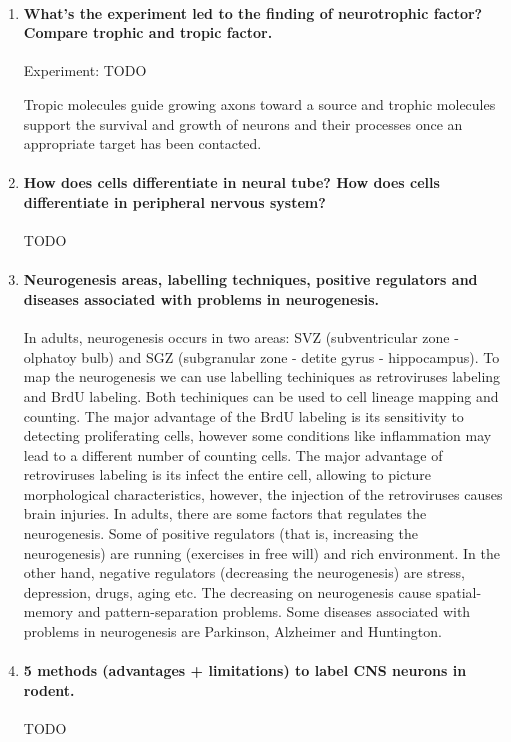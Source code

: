 \documentclass[12pt,article,oneside,a4paper]{memoir}
\begin{document}
\begin{enumerate}
\item \paragraph{What’s the experiment led to the finding of neurotrophic factor? Compare trophic and tropic factor.}
Experiment: TODO

Tropic molecules guide growing axons toward a source and trophic molecules support the survival and growth of neurons and their processes once an appropriate target has been contacted.

\item \paragraph{How does cells differentiate in neural tube? How does cells differentiate in peripheral nervous system?}
TODO

\item \paragraph{Neurogenesis areas, labelling techniques, positive regulators and diseases associated with problems in neurogenesis.}
In adults, neurogenesis occurs in two areas: SVZ (subventricular zone - olphatoy bulb) and SGZ (subgranular zone - detite gyrus - hippocampus). To map the neurogenesis we can use labelling techiniques as retroviruses labeling and BrdU labeling. Both techiniques can be used to cell lineage mapping and counting. The major advantage of the BrdU labeling is its sensitivity to detecting proliferating cells, however some conditions like inflammation may lead to a different number of counting cells. The major advantage of retroviruses labeling is its infect the entire cell, allowing to picture morphological characteristics, however, the injection of the retroviruses causes brain injuries.
In adults, there are some factors that regulates the neurogenesis. Some of positive regulators (that is, increasing the neurogenesis) are running (exercises in free will) and rich environment. In the other hand, negative regulators (decreasing the neurogenesis) are stress, depression, drugs, aging etc.
The decreasing on neurogenesis cause spatial-memory and pattern-separation problems.
Some diseases associated with problems in neurogenesis are Parkinson, Alzheimer and Huntington.

\item \paragraph{5 methods (advantages + limitations) to label CNS neurons in rodent.}
TODO


\end{enumerate}
\end{document}

